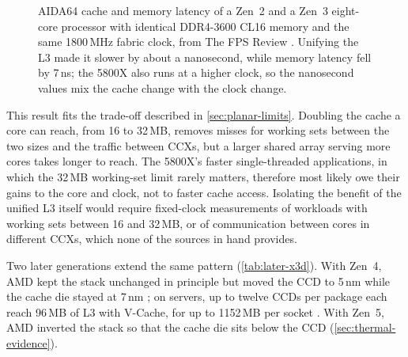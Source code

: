 \begin{figure}[htbp]
\centering
{}
\caption[AIDA64 latency of a Zen~2 and a Zen~3 eight-core processor]{AIDA64 cache and memory latency of a Zen~2 and a Zen~3 eight-core processor with identical DDR4-3600 CL16 memory and the same 1800\,MHz fabric clock, from The FPS Review \cite{justiceAMDRyzen72021}. Unifying the L3 made it slower by about a nanosecond, while memory latency fell by 7\,ns; the 5800X also runs at a higher clock, so the nanosecond values mix the cache change with the clock change.}
\label{fig:zen2-zen3-latency}
\end{figure}


This result fits the trade-off described in \cref{sec:planar-limits}. Doubling the cache a core can reach, from 16 to 32\,MB, removes misses for working sets between the two sizes and the traffic between CCXs, but a larger shared array serving more cores takes longer to reach. The 5800X's faster single-threaded applications, in which the 32\,MB working-set limit rarely matters, therefore most likely owe their gains to the core and clock, not to faster cache access. Isolating the benefit of the unified L3 itself would require fixed-clock measurements of workloads with working sets between 16 and 32\,MB, or of communication between cores in different CCXs, which none of the sources in hand provides.

Two later generations extend the same pattern (\cref{tab:later-x3d}). With Zen~4, AMD kept the stack unchanged in principle but moved the CCD to 5\,nm while the cache die stayed at 7\,nm \cite{alam2ndGeneration3D2024}; on servers, up to twelve CCDs per package each reach 96\,MB of L3 with V-Cache, for up to 1152\,MB per socket \cite{advancedmicrodevicesinc.4thGenAMD2023}. With Zen~5, AMD inverted the stack so that the cache die sits below the CCD (\cref{sec:thermal-evidence}).

